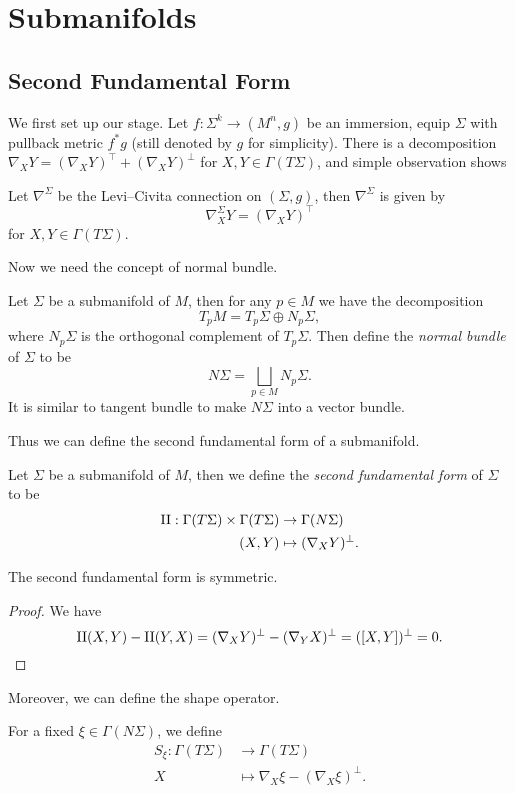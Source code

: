 \chapter{Submanifolds}

\section{Second Fundamental Form}

We first set up our stage.
Let $f:\Sigma^k\to(M^n,g)$ be an immersion, equip $\Sigma$ with pullback metric $f^*g$ (still denoted by $g$ for simplicity).
There is a decomposition $\nabla_XY=(\nabla_XY)^\top+(\nabla_XY)^\perp$ for $X,Y\in\Gamma(T\Sigma)$, and simple observation shows
\begin{prop}
    Let $\nabla^\Sigma$ be the Levi--Civita connection on $(\Sigma,g)$, then $\nabla^\Sigma$ is given by
    \[\nabla^\Sigma_XY=(\nabla_XY)^\top\]
    for $X,Y\in\Gamma(T\Sigma)$.
\end{prop}

Now we need the concept of normal bundle.
\begin{defn}
    Let $\Sigma$ be a submanifold of $M$, then for any $p\in M$ we have the decomposition
    \[T_pM=T_p\Sigma\oplus N_p\Sigma,\]
    where $N_p\Sigma$ is the orthogonal complement of $T_p\Sigma$.
    Then define the \emph{normal bundle} of $\Sigma$ to be
    \[N\Sigma=\bigsqcup_{p\in M}N_p\Sigma.\]
    It is similar to tangent bundle to make $N\Sigma$ into a vector bundle.
\end{defn}

Thus we can define the second fundamental form of a submanifold.
\begin{defn}
    Let $\Sigma$ be a submanifold of $M$, then we define the \emph{second fundamental form} of $\Sigma$ to be
    \begin{align*}
        \operatorname{II}:\Gamma(T\Sigma)\times\Gamma(T\Sigma)&\to\Gamma(N\Sigma)\\
        (X,Y)&\mapsto(\nabla_XY)^\perp.
    \end{align*}
\end{defn}
\begin{lem}
    The second fundamental form is symmetric.
\end{lem}
\begin{proof}
    We have
    \[\operatorname{II}(X,Y)-\operatorname{II}(Y,X)=(\nabla_XY)^\perp-(\nabla_YX)^\perp=([X,Y])^\perp=0.\qedhere\]
\end{proof}

Moreover, we can define the shape operator.
\begin{defn}
    For a fixed $\xi\in\Gamma(N\Sigma)$, we define
    \begin{align*}
        S_\xi:\Gamma(T\Sigma)&\to\Gamma(T\Sigma)\\
        X&\mapsto\nabla_X\xi-(\nabla_X\xi)^\perp.
    \end{align*}
\end{defn}

